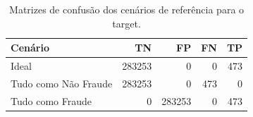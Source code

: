 \begin{table}
\caption{Matrizes de confusão dos cenários de referência para o target.}
\label{tab:matrizes-baseline-target}
\begin{tabular}{lrrrr}
\toprule
Cenário & TN & FP & FN & TP \\
\midrule
Ideal & 283253 & 0 & 0 & 473 \\
Tudo como Não Fraude & 283253 & 0 & 473 & 0 \\
Tudo como Fraude & 0 & 283253 & 0 & 473 \\
\bottomrule
\end{tabular}
\end{table}
